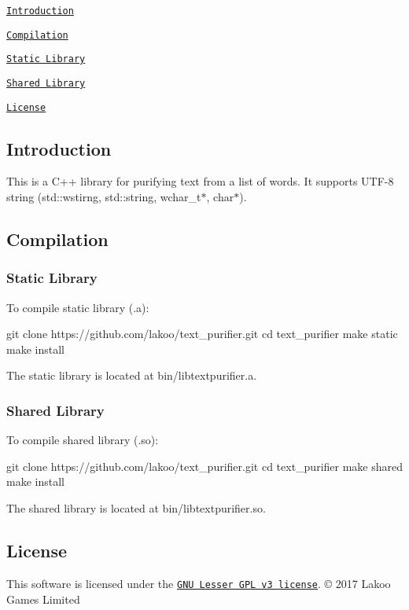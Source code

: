 
\begin{DoxyItemize}
\item \href{#introduction}{\tt Introduction}
\item \href{#compilation}{\tt Compilation}
\begin{DoxyItemize}
\item \href{#static-library}{\tt Static Library}
\item \href{#shared-library}{\tt Shared Library}
\end{DoxyItemize}
\item \href{#license}{\tt License}
\end{DoxyItemize}

\subsection*{Introduction}

This is a C++ library for purifying text from a list of words. It supports U\+T\+F-\/8 string (std\+::wstirng, std\+::string, wchar\+\_\+t$\ast$, char$\ast$).

\subsection*{Compilation}

\subsubsection*{Static Library}

To compile static library (.a)\+: 
\begin{DoxyCode}
git clone https://github.com/lakoo/text\_purifier.git
cd text\_purifier
make static
make install
\end{DoxyCode}


The static library is located at {\ttfamily bin/libtextpurifier.\+a}.

\subsubsection*{Shared Library}

To compile shared library (.so)\+: 
\begin{DoxyCode}
git clone https://github.com/lakoo/text\_purifier.git
cd text\_purifier
make shared
make install
\end{DoxyCode}


The shared library is located at {\ttfamily bin/libtextpurifier.\+so}.

\subsection*{License}

This software is licensed under the \href{https://www.gnu.org/copyleft/lgpl.html}{\tt G\+NU Lesser G\+PL v3 license}. © 2017 Lakoo Games Limited 